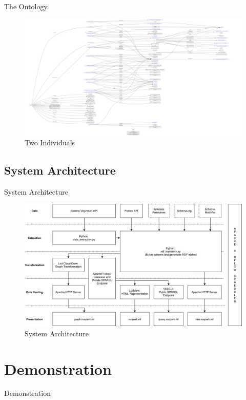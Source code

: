 \documentclass{beamer}
\begin{document}
	\begin{frame}{The Ontology}
		\begin{figure}
			\includegraphics[scale=0.04]{resources/graph.png}
			\caption{Two Individuals}
		\end{figure}
	\end{frame}
	\subsection{System Architecture}
	\begin{frame}{System Architecture}
		\begin{figure}
			\includegraphics[scale=0.075]{resources/system-architecture.png}
			\caption{System Architecture}
		\end{figure}
	\end{frame}

	\section{Demonstration}
	\begin{frame}{Demonstration}
	\end{frame}
\end{document}
